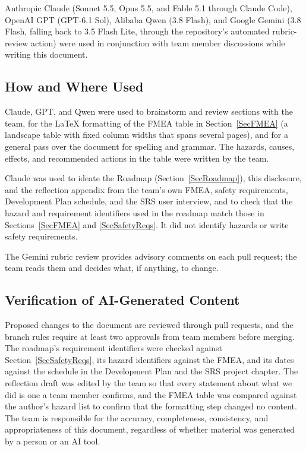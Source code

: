 \documentclass{article}
\begin{document}
Anthropic Claude (Sonnet 5.5, Opus 5.5, and Fable 5.1 through Claude Code),
OpenAI GPT (GPT-6.1 Sol), Alibaba Qwen (3.8 Flash), and Google Gemini
(3.8 Flash, falling back to 3.5 Flash Lite, through the repository's
automated rubric-review action) were used in conjunction with team member
discussions while writing this document.

\subsection{How and Where Used}

Claude, GPT, and Qwen were used to brainstorm and review sections with the team,
for the \LaTeX{} formatting of the FMEA table in Section~\ref{SecFMEA} (a
landscape table with fixed column widths that spans several pages), and for
a general pass over the document for spelling and grammar. The hazards,
causes, effects, and recommended actions in the table were written by the
team.

Claude was used to ideate the Roadmap (Section~\ref{SecRoadmap}), this
disclosure, and the reflection appendix from the team's own FMEA, safety
requirements, Development Plan schedule, and the SRS user interview, and to
check that the hazard and requirement identifiers used in the roadmap match
those in Sections~\ref{SecFMEA} and \ref{SecSafetyReqs}. It did not identify
hazards or write safety requirements.

The Gemini rubric review provides advisory comments on each pull request;
the team reads them and decides what, if anything, to change.

\subsection{Verification of AI-Generated Content}

Proposed changes to the document are reviewed through pull requests, and the
branch rules require at least two approvals from team members before
merging. The roadmap's requirement identifiers were checked against
Section~\ref{SecSafetyReqs}, its hazard identifiers against the FMEA, and
its dates against the schedule in the Development Plan and the SRS project
chapter. The reflection draft was edited by the team so that every statement
about what we did is one a team member confirms, and the FMEA table was
compared against the author's hazard list to confirm that the formatting
step changed no content. The team is responsible for the accuracy,
completeness, consistency, and appropriateness of this document, regardless
of whether material was generated by a person or an AI tool.
\end{document}
